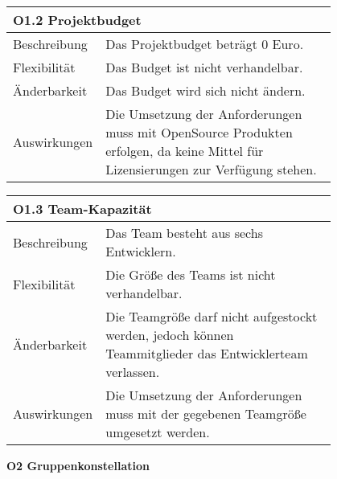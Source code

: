 {%

\begin{table}[htbp]
\centering
\begin{tabular}{|l|p{0.8\linewidth}|}
\hline
\multicolumn{2}{|l|}{\textbf{O1.2 Projektbudget}}
  \tabularnewline \hline
Beschreibung                                               & Das Projektbudget beträgt 0 Euro.                                      \tabularnewline \hline
Flexibilität                                              & Das Budget ist nicht verhandelbar.                                                                                \tabularnewline \hline
Änderbarkeit                                         & Das Budget wird sich nicht ändern.                                                                 \tabularnewline \hline
Auswirkungen                                                & Die Umsetzung der Anforderungen muss mit OpenSource Produkten erfolgen, da keine Mittel für Lizensierungen zur Verfügung stehen.                                       \tabularnewline \hline
 \hline
\end{tabular}
\end{table}
\begin{table}[htbp]
\centering
\begin{tabular}{|l|p{0.8\linewidth}|}
\hline
\multicolumn{2}{|l|}{\textbf{O1.3 Team-Kapazität}}
  \tabularnewline \hline
Beschreibung                                               & Das Team besteht aus sechs Entwicklern.                                      \tabularnewline \hline
Flexibilität                                              & Die Größe des Teams ist nicht verhandelbar. \tabularnewline \hline
Änderbarkeit                                         & Die Teamgröße darf nicht aufgestockt werden, jedoch können Teammitglieder das Entwicklerteam verlassen. \tabularnewline \hline
Auswirkungen                                                & Die Umsetzung der Anforderungen muss mit der gegebenen Teamgröße umgesetzt werden.                                      \tabularnewline \hline
 \hline
\end{tabular}
\end{table}
\newpage
\textbf{O2 Gruppenkonstellation}

}
